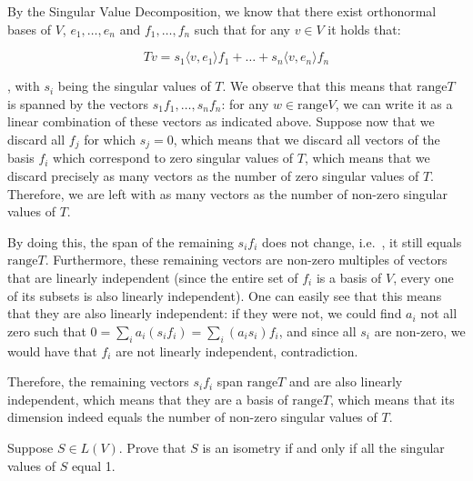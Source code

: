 \begin{solution}

    By the Singular Value Decomposition, we know that there exist orthonormal bases of $V$, $e_1, \ldots, e_n$ and $f_1, \ldots, f_n$ such that for any $v \in V$ it holds that:

    $$Tv = s_1 \langle v, e_1 \rangle f_1 + \ldots + s_n \langle v, e_n \rangle f_n$$

    , with $s_i$ being the singular values of $T$. We observe that this means that $\text{range} T$ is spanned by the vectors $s_1 f_1, \ldots, s_n f_n$: for any $w \in \text{range} V$, we can write it as a linear combination of these vectors as indicated above. Suppose now that we discard all $f_j$ for which $s_j = 0$, which means that we discard all vectors of the basis $f_i$ which correspond to zero singular values of $T$, which means that we discard precisely as many vectors as the number of zero singular values of $T$. Therefore, we are left with as many vectors as the number of non-zero singular values of $T$.

    By doing this, the span of the remaining $s_i f_i$ does not change, i.e.\ , it still equals $\text{range} T$. Furthermore, these remaining vectors are non-zero multiples of vectors that are linearly independent (since the entire set of $f_i$ is a basis of $V$, every one of its subsets is also linearly independent). One can easily see that this means that they are also linearly independent: if they were not, we could find $a_i$ not all zero such that $0 = \sum_i a_i(s_if_i) = \sum_i (a_i s_i) f_i$, and since all $s_i$ are non-zero, we would have that $f_i$ are not linearly independent, contradiction.

    Therefore, the remaining vectors $s_i f_i$ span $\text{range} T$ and are also linearly independent, which means that they are a basis of $\text{range} T$, which means that its dimension indeed equals the number of non-zero singular values of $T$.
\end{solution}

\begin{exercise}{15}
    Suppose $S \in L(V)$. Prove that $S$ is an isometry if and only if all the singular values of $S$ equal 1.
\end{exercise}

